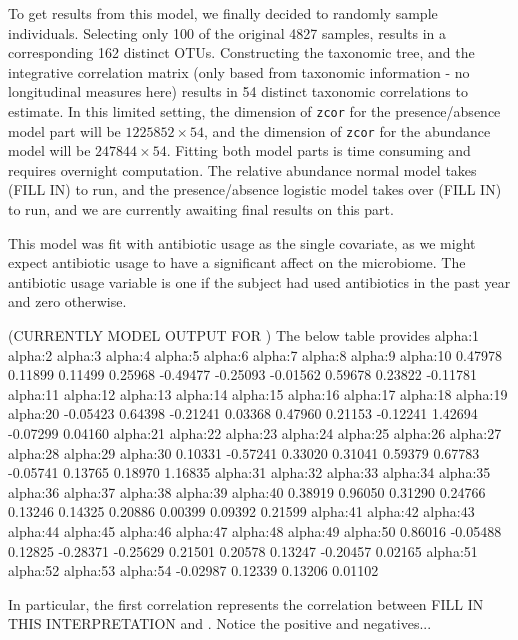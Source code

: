 \documentclass[12pt]{article}
\begin{document}
To get results from this model, we finally decided to randomly sample individuals. Selecting only 100 of the original 4827 samples, results in a corresponding 162 distinct OTUs. Constructing the taxonomic tree, and the integrative correlation matrix (only based from taxonomic information - no longitudinal measures here) results in 54 distinct taxonomic correlations to estimate. In this limited setting, the dimension of \texttt{zcor} for the presence/absence model part will be $1225852 \times 54$, and the dimension of \texttt{zcor} for the abundance model will be $247844 \times 54$. Fitting both model parts is time consuming and requires overnight computation. The relative abundance normal model takes (FILL IN) to run, and the presence/absence logistic model takes over (FILL IN) to run, and we are currently awaiting final results on this part.

This model was fit with antibiotic usage as the single covariate, as we might expect antibiotic usage to have a significant affect on the microbiome. The antibiotic usage variable is one if the subject had used antibiotics in the past year and zero otherwise.

\begin{singlespace}
(CURRENTLY MODEL OUTPUT FOR )
The below table provides
alpha:1  alpha:2  alpha:3  alpha:4  alpha:5  alpha:6  alpha:7  alpha:8  alpha:9 alpha:10
 0.47978  0.11899  0.11499  0.25968 -0.49477 -0.25093 -0.01562  0.59678  0.23822 -0.11781
alpha:11 alpha:12 alpha:13 alpha:14 alpha:15 alpha:16 alpha:17 alpha:18 alpha:19 alpha:20
-0.05423  0.64398 -0.21241  0.03368  0.47960  0.21153 -0.12241  1.42694 -0.07299  0.04160
alpha:21 alpha:22 alpha:23 alpha:24 alpha:25 alpha:26 alpha:27 alpha:28 alpha:29 alpha:30
 0.10331 -0.57241  0.33020  0.31041  0.59379  0.67783 -0.05741  0.13765  0.18970  1.16835
alpha:31 alpha:32 alpha:33 alpha:34 alpha:35 alpha:36 alpha:37 alpha:38 alpha:39 alpha:40
 0.38919  0.96050  0.31290  0.24766  0.13246  0.14325  0.20886  0.00399  0.09392  0.21599
alpha:41 alpha:42 alpha:43 alpha:44 alpha:45 alpha:46 alpha:47 alpha:48 alpha:49 alpha:50
 0.86016 -0.05488  0.12825 -0.28371 -0.25629  0.21501  0.20578  0.13247 -0.20457  0.02165
alpha:51 alpha:52 alpha:53 alpha:54
-0.02987  0.12339  0.13206  0.01102
\end{singlespace}


In particular, the first correlation represents the correlation between FILL IN THIS INTERPRETATION and .
Notice the positive and negatives...
\end{document}
